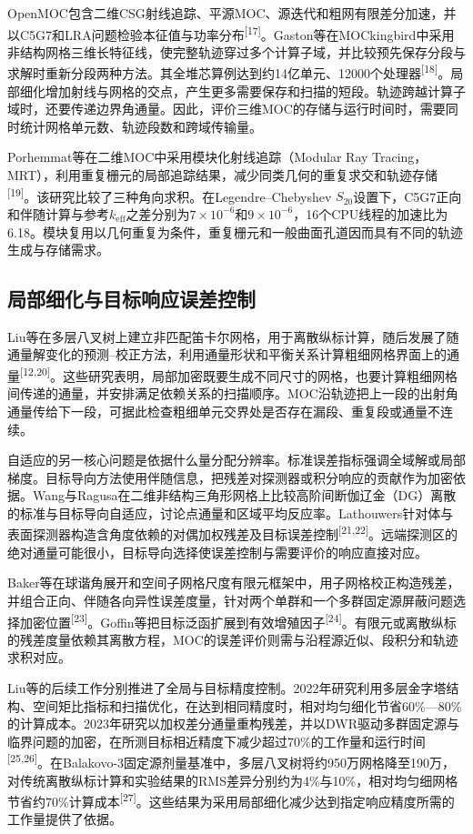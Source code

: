 \documentclass[UTF8, zihao=-4, fontset=none, a4paper]{ctexart}
\newcommand{\upcite}[1]{\textsuperscript{[#1]}}
\begin{document}
OpenMOC包含二维CSG射线追踪、平源MOC、源迭代和粗网有限差分加速，并以C5G7和LRA问题检验本征值与功率分布\upcite{17}。Gaston等在MOCkingbird中采用非结构网格三维长特征线，使完整轨迹穿过多个计算子域，并比较预先保存分段与求解时重新分段两种方法。其全堆芯算例达到约14亿单元、12000个处理器\upcite{18}。局部细化增加射线与网格的交点，产生更多需要保存和扫描的短段。轨迹跨越计算子域时，还要传递边界角通量。因此，评价三维MOC的存储与运行时间时，需要同时统计网格单元数、轨迹段数和跨域传输量。

Porhemmat等在二维MOC中采用模块化射线追踪（Modular Ray Tracing，MRT），利用重复栅元的局部追踪结果，减少同类几何的重复求交和轨迹存储\upcite{19}。该研究比较了三种角向求积。在Legendre--Chebyshev $S_{20}$设置下，C5G7正向和伴随计算与参考$k_{\mathrm{eff}}$之差分别为$7\times10^{-6}$和$9\times10^{-6}$，16个CPU线程的加速比为6.18。模块复用以几何重复为条件，重复栅元和一般曲面孔道因而具有不同的轨迹生成与存储需求。

\subsection{局部细化与目标响应误差控制}

Liu等在多层八叉树上建立非匹配笛卡尔网格，用于离散纵标计算，随后发展了随通量解变化的预测--校正方法，利用通量形状和平衡关系计算粗细网格界面上的通量\upcite{12,20}。这些研究表明，局部加密既要生成不同尺寸的网格，也要计算粗细网格间传递的通量，并安排满足依赖关系的扫描顺序。MOC沿轨迹把上一段的出射角通量传给下一段，可据此检查粗细单元交界处是否存在漏段、重复段或通量不连续。

自适应的另一核心问题是依据什么量分配分辨率。标准误差指标强调全域解或局部梯度。目标导向方法使用伴随信息，把残差对探测器或积分响应的贡献作为加密依据。Wang与Ragusa在二维非结构三角形网格上比较高阶间断伽辽金（DG）离散的标准与目标导向自适应，讨论点通量和区域平均反应率。Lathouwers针对体与表面探测器构造含角度依赖的对偶加权残差及目标误差控制\upcite{21,22}。远端探测区的绝对通量可能很小，目标导向选择使误差控制与需要评价的响应直接对应。

Baker等在球谐角展开和空间子网格尺度有限元框架中，用子网格校正构造残差，并组合正向、伴随各向异性误差度量，针对两个单群和一个多群固定源屏蔽问题选择加密位置\upcite{23}。Goffin等把目标泛函扩展到有效增殖因子\upcite{24}。有限元或离散纵标的残差度量依赖其离散方程，MOC的误差评价则需与沿程源近似、段积分和轨迹求积对应。

Liu等的后续工作分别推进了全局与目标精度控制。2022年研究利用多层金字塔结构、空间矩比指标和扫描优化，在达到相同精度时，相对均匀细化节省60\%---80\%的计算成本。2023年研究以加权差分通量重构残差，并以DWR驱动多群固定源与临界问题的加密，在所测目标相近精度下减少超过70\%的工作量和运行时间\upcite{25,26}。在Balakovo-3固定源剂量基准中，多层八叉树将约950万网格降至190万，对传统离散纵标计算和实验结果的RMS差异分别约为4\%与10\%，相对均匀细网格节省约70\%计算成本\upcite{27}。这些结果为采用局部细化减少达到指定响应精度所需的工作量提供了依据。
\end{document}
